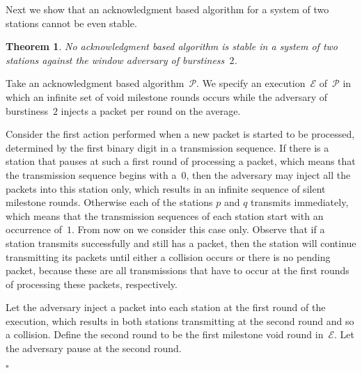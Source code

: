 \documentclass[11pt]{article}
\newcommand{\cE}{\mathcal{E}}
\newcommand{\cP}{\mathcal{P}}
\newcommand{\qed}{\hfill $\square$ \smallbreak}
\newenvironment{proof}{\noindent{\bf Proof:}}{\qed}
\newtheorem{theorem}{Theorem}
\begin{document}
Next we show that an acknowledgment based algorithm for a system of two stations cannot be even stable.



\begin{theorem}
\label{thm:impossible-2ack-based-stable}
No acknowledgment based algorithm is stable in a system of two stations against the window adversary of burstiness~$2$.
\end{theorem}

\begin{proof}
Take an acknowledgment based algorithm~$\cP$.
We specify an execution~$\cE$ of~$\cP$ in which an infinite set of void milestone rounds occurs while the adversary of burstiness~$2$ injects a packet per round on the average.

Consider the first action performed when a new packet is started to be processed, determined by the first binary digit in a transmission sequence.
If there is a station that pauses at such a first round of processing a packet, which means that the transmission sequence begins with a~$0$, then the adversary may inject all the packets into this station only, which results in an infinite sequence of silent milestone rounds.
Otherwise each of the stations $p$ and $q$ transmits immediately, which means that the transmission sequences of each station start with an occurrence of~$1$.
From now on we consider this case only.
Observe that if a station transmits successfully and still has a packet, then the station will continue transmitting its packets until either a collision occurs or there is no pending packet, because these are all transmissions that have to occur at the first rounds of processing these packets, respectively.

Let the adversary inject a packet into each station at the first round of the execution, which results in both stations transmitting at the second round and so a collision. 
Define the second round to be the first milestone void round in~$\cE$.
Let the adversary pause at the second round.


\end{proof}
\end{document}
